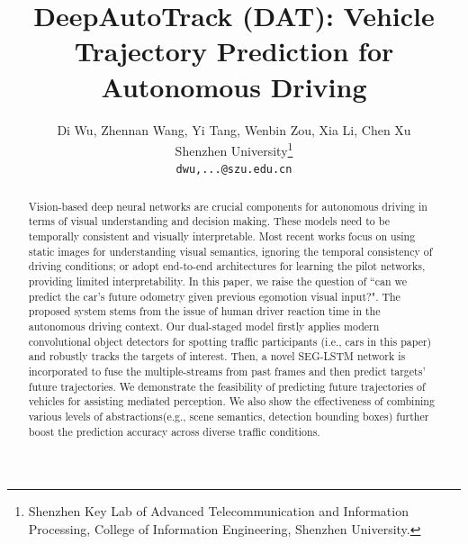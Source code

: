 \documentclass[10pt,twocolumn,letterpaper]{article}
\begin{document}
\title{DeepAutoTrack (DAT): Vehicle Trajectory Prediction for Autonomous Driving}

\author{Di Wu, Zhennan Wang, Yi Tang,  Wenbin Zou, Xia Li, Chen Xu\\
Shenzhen University\thanks{Shenzhen Key Lab of Advanced Telecommunication and Information Processing, College of Information Engineering, Shenzhen University.}\\
{\tt\small dwu,...@szu.edu.cn}}
\maketitle
\begin{abstract}

Vision-based deep neural networks are crucial components for autonomous driving in terms of visual understanding and decision making.
These models need to be temporally consistent and visually interpretable.
Most recent works focus on using static images for understanding visual semantics, ignoring the temporal consistency of driving conditions; or adopt end-to-end architectures for learning the pilot networks, providing limited interpretability.
In this paper, we raise the question of ``can we predict the car's future odometry given previous egomotion visual input?".
The proposed system stems from the issue of human driver reaction time in the autonomous driving context.
Our dual-staged model firstly applies modern convolutional object detectors for spotting traffic participants (i.e., cars in this paper) and robustly tracks the targets of interest.
Then, a novel SEG-LSTM network is incorporated to fuse the multiple-streams from past frames and then predict targets' future trajectories.
We demonstrate the feasibility of predicting future trajectories of vehicles for assisting mediated perception.
We also show the effectiveness of combining various levels of abstractions(e.g., scene semantics, detection bounding boxes) further boost the prediction accuracy across diverse traffic conditions.
\end{abstract}
\end{document}
